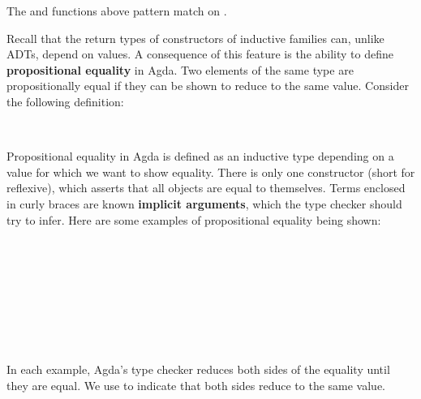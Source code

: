 \documentclass[12pt,a4paper,twoside,openright]{report}
\newcommand{\C}{\AgdaInductiveConstructor}
\newcommand{\F}{\AgdaFunction}
\begin{document}
The \F{not} and \F{$\_\!\!\land\!\!\_$} functions above pattern match on \F{Bool}.

Recall that the return types of constructors of inductive families can, unlike ADTs, depend on values. A consequence of this feature is the ability to define {\bf propositional equality} in Agda. Two elements of the same type are propositionally equal if they can be shown to reduce to the same value. Consider the following definition:

\begin{code}
\>  \AgdaSymbol{\{} \AgdaSymbol{:} \AgdaSymbol{\}} \AgdaSymbol{(} \AgdaSymbol{:} \AgdaSymbol{)} \AgdaSymbol{:}    \<%
\\
\>[0]\<[2]%
\>[2] \AgdaSymbol{:}   \<%
\end{code}
Propositional equality in Agda is defined as an inductive type depending on a value for which we want to show equality. There is only one constructor \C{refl} (short for reflexive), which asserts that all objects are equal to themselves. Terms enclosed in curly braces are known {\bf implicit arguments}, which the type checker should try to infer.  
Here are some examples of propositional equality being shown: 

\begin{code}
\> \AgdaSymbol{:}   \<%
\\
\> \AgdaSymbol{=} \<%
\\
%
\\
\> \AgdaSymbol{:}  \AgdaPrimitive{+}   \<%
\\
\> \AgdaSymbol{=} \<%
\\
%
\\
\> \AgdaSymbol{:} \AgdaFunction{[}  \AgdaFunction{]}  \AgdaSymbol{(} \AgdaPrimitive{+} \AgdaSymbol{)}  \AgdaInductiveConstructor{[]}\<%
\\
\> \AgdaSymbol{=} \<%
\end{code}
In each example, Agda's type checker reduces both sides of the equality until they are equal. We use \C{refl} to indicate that both sides reduce to the same value.
\end{document}
